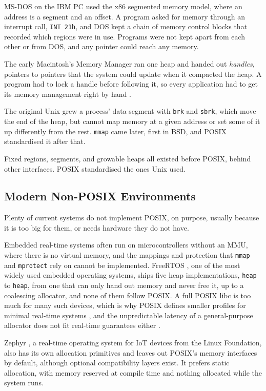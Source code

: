 \documentclass[12pt]{report}
\renewcommand{\_}{\origunderscore\allowbreak}
\begin{document}
MS-DOS on the IBM PC used the x86 segmented memory model, where an address is a segment and an offset. A program asked for memory through an interrupt call, \texttt{INT 21h}, and DOS kept a chain of memory control blocks that recorded which regions were in use. Programs were not kept apart from each other or from DOS, and any pointer could reach any memory.

The early Macintosh's Memory Manager ran one heap and handed out \emph{handles}, pointers to pointers that the system could update when it compacted the heap. A program had to lock a handle before following it, so every application had to get its memory management right by hand \cite{apple1985inside}.

The original Unix \cite{ritchie1974unix} grew a process' data segment with \texttt{brk} and \texttt{sbrk}, which move the end of the heap, but cannot map memory at a given address or set some of it up differently from the rest. \texttt{mmap} came later, first in BSD, and POSIX standardised it after that.

Fixed regions, segments, and growable heaps all existed before POSIX, behind other interfaces. POSIX standardised the ones Unix used.

\subsection{Modern Non-POSIX Environments}

Plenty of current systems do not implement POSIX, on purpose, usually because it is too big for them, or needs hardware they do not have.

Embedded real-time systems often run on microcontrollers without an MMU, where there is no virtual memory, and the mappings and protection that \texttt{mmap} and \texttt{mprotect} rely on cannot be implemented. FreeRTOS \cite{freertos}, one of the most widely used embedded operating systems, ships five heap implementations, \texttt{heap\_1} to \texttt{heap\_5}, from one that can only hand out memory and never free it, up to a coalescing allocator, and none of them follow POSIX. A full POSIX libc is too much for many such devices, which is why POSIX defines smaller profiles for minimal real-time systems \cite{ieee2003posix-aep}, and the unpredictable latency of a general-purpose allocator does not fit real-time guarantees either \cite{masmano2004tlsf}.

Zephyr \cite{zephyr}, a real-time operating system for IoT devices from the Linux Foundation, also has its own allocation primitives and leaves out POSIX's memory interfaces by default, although optional compatibility layers exist. It prefers static allocation, with memory reserved at compile time and nothing allocated while the system runs.
\end{document}
